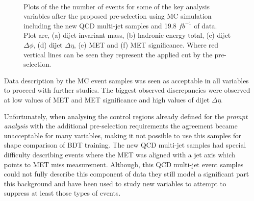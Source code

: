 \begin{figure}[!htb]
 \\
\caption{Plots of the the number of events for some of the key analysis variables after the proposed pre-selection using \gls{MC} simulation including the new \gls{QCD} multi-jet samples and 19.8 $fb^{-1}$ of data. Plot are, (a) dijet invariant mass, (b) hadronic energy total, (c) dijet $\Delta\phi$, (d) dijet $\Delta\eta$, (e) \gls{MET} and (f) \gls{MET} significance. Where red vertical lines can be seen they represent the applied cut by the pre-selection.}
\label{FIGURE:PreparationParkedDataAnalysis_QCDVBFMET_PreSectionVariables}
\end{figure}

Data description by the \gls{MC} event samples was seen as acceptable in all variables to proceed with further studies. The biggest observed discrepancies were observed at low values of \gls{MET} and \gls{MET} significance and high values of dijet $\Delta\eta$.

Unfortunately, when analysing the control regions already defined for the \textit{prompt analysis} with the additional pre-selection requirements the agreement became unacceptable for many variables, making it not possible to use this samples for shape comparison of \gls{BDT} training. The new \gls{QCD} multi-jet samples had special difficulty describing events where the \gls{MET} was aligned with a jet axis which points to \gls{MET} miss measurement. Although, this \gls{QCD} multi-jet event samples could not fully describe this component of data they still model a significant part this background and have been used to study new variables to attempt to suppress at least those types of events. 

